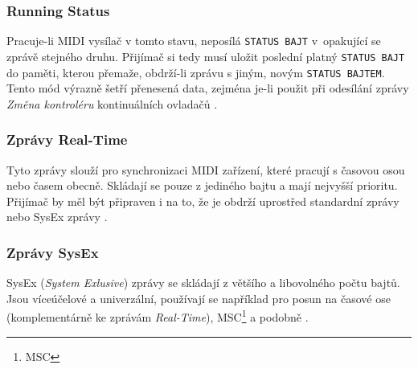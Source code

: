 \subsubsection{Running Status}
Pracuje-li \acs{MIDI} vysílač v tomto stavu, neposílá \texttt{STATUS BAJT} v~opakující se zprávě stejného druhu. Přijímač si tedy musí uložit poslední platný \texttt{STATUS BAJT} do paměti, kterou přemaže, obdrží-li zprávu s jiným, novým \texttt{STATUS BAJTEM}. Tento mód výrazně šetří přenesená data, zejména je-li použit při odesílání zprávy \emph{Změna kontroléru} kontinuálních ovladačů \cite{MIDIspecs}.

\subsubsection{Zprávy Real-Time}
Tyto zprávy slouží pro synchronizaci \acs{MIDI} zařízení, které pracují s časovou osou nebo časem obecně. Skládají se pouze z jediného bajtu a mají nejvyšší prioritu. Přijímač by měl být připraven i na to, že je obdrží uprostřed standardní zprávy nebo SysEx zprávy \cite{MIDIspecs}.

\subsubsection{Zprávy SysEx}
SysEx (\emph{System Exlusive}) zprávy se skládají z většího a libovolného počtu bajtů. Jsou víceúčelové a univerzální, používají se například pro posun na časové ose (komplementárně ke zprávám \emph{Real-Time}), \acs{MSC}\footnote{\acl{MSC}} a podobně \cite{MIDIspecs}.

%